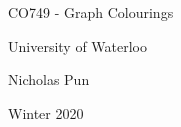 \documentclass[12pt]{article}
\begin{document}
\begin{titlepage}
  \centering
  \vspace*{2in}
  {\huge CO749 - Graph Colourings}\par
  \vspace{0.5in}
  {\large University of Waterloo}\par
  {\large Nicholas Pun}\par
  {\large Winter 2020}\par 
 \end{titlepage}
 
\tableofcontents
\clearpage


\end{document}

